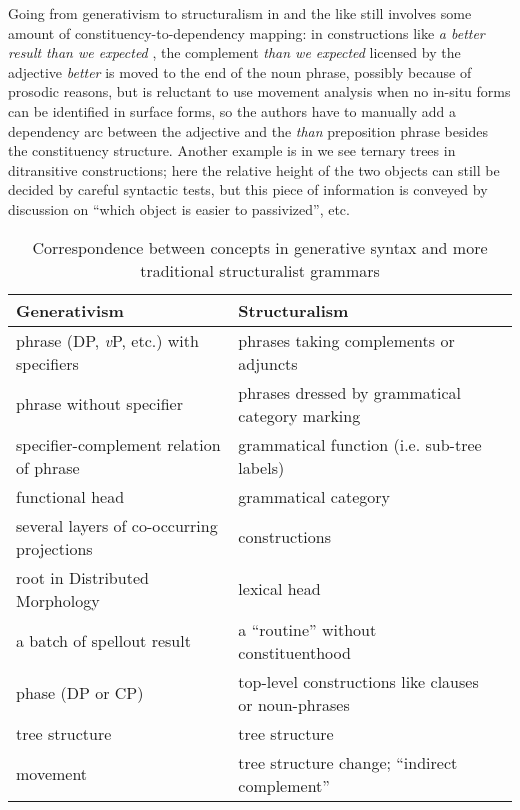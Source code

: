 \documentclass[UTF8, a4paper, oneside, scheme=plain, 12pt]{ctexbook}
\newcommand*{\citepage}[1]{p.~{#1}}
\newcommand{\form}[1]{\emph{#1}}
\newcommand{\vP}{\textit{v}P}
\begin{document}
{Going from generativism to structuralism 
in \citet{cgel} and the like 
still involves some amount of constituency-to-dependency mapping: 
in constructions like \form{a better result than we expected}
\citep[\citepage{55}]{cgel},
the complement \form{than we expected} licensed by the adjective \form{better}
is moved to the end of the noun phrase, 
possibly because of prosodic reasons, 
but \citet{cgel} is reluctant to use movement analysis 
when no in-situ forms can be identified in surface forms, 
so the authors have to manually add a dependency arc 
between the adjective and the \form{than} preposition phrase 
besides the constituency structure. 
Another example is in \citet{cgel} 
we see ternary trees in ditransitive constructions; 
here the relative height of the two objects can still be decided by 
careful syntactic tests, 
but this piece of information is conveyed by discussion on 
``which object is easier to passivized'', etc.

\begin{table}[H]
    \caption{Correspondence between concepts in generative syntax and more traditional structuralist grammars}
    \label{tbl:theory.cgel}
    \centering
    \small
    \begin{tabular}{@{}lll@{}}
    \toprule
    Generativism                               & Structuralism                                          \\ \midrule
    phrase (DP, \vP, etc.) with specifiers     & phrases taking complements or adjuncts                        \\
    phrase without specifier                   & phrases dressed by grammatical category marking             \\
    specifier-complement relation of phrase    & grammatical function (i.e. sub-tree labels)  \\
    functional head                            & grammatical category                     \\
    several layers of co-occurring projections & constructions                                 \\
    root in Distributed Morphology             & lexical head                                          \\
    a batch of spellout result                 & a ``routine'' without constituenthood    \\
    phase (DP or CP)                           & top-level constructions like clauses or noun-phrases                          \\
    tree structure                             & tree structure  \\
    movement                                   & tree structure change; ``indirect complement''                            \\ \bottomrule
    \end{tabular}
\end{table}

}
\end{document}
